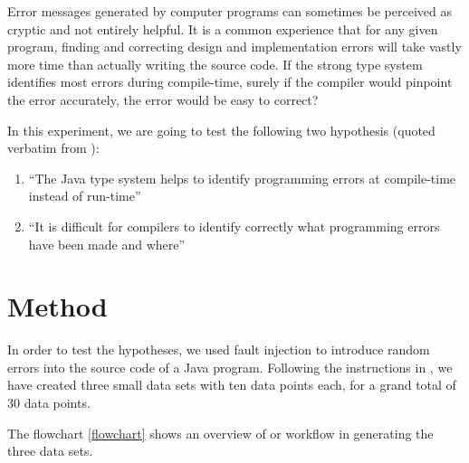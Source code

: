 \documentclass[10pt]{report}
\begin{document}
Error messages generated by computer programs can sometimes be perceived as cryptic and not entirely helpful.  It is a common experience that for any given program, finding and correcting design and implementation errors will take vastly more time than actually writing the source code.  If the strong type system identifies most errors during compile-time, surely if the compiler would pinpoint the error accurately, the error would be easy to correct?

In this experiment, we are going to test the following two hypothesis (quoted verbatim from \cite[p1]{bradley}):

\begin{enumerate}
    \item ``The Java type system helps to identify programming errors at compile-time instead of run-time''
    \item ``It is difficult for compilers to identify correctly what programming errors have been made and where''
\end{enumerate}

\chapter{Method}
\thispagestyle{fancy}

In order to test the hypotheses, we used fault injection \cite[p1]{bradley} to introduce random errors into the source code of a Java program.   Following the instructions in \cite{bradley}, we have created three small data sets with ten data points each, for a grand total of 30 data points.

The flowchart \ref{flowchart} shows an overview of or workflow in generating the three data sets.
\end{document}
